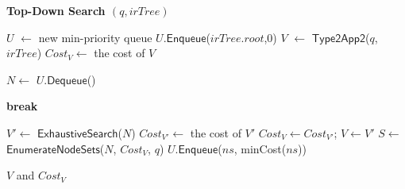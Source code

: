 \documentclass{sig-alternate}
\begin{document}
\begin{algorithm}[!t]  \label{alg:pb2exact} \small
\caption{\label{alg:topk} \bf {Top-Down Search} $(q, irTree)$}



$U$ $\leftarrow$ new min-priority queue\;
%
$U$.$\mathsf{Enqueue}$($irTree.root$,0)\;
%
$V$ $\leftarrow$ $\mathsf{Type2App2}$($q$, $irTree$)\; $Cost_V
\leftarrow$ the cost of $V$\;


 {
    $N \leftarrow$ $U$.$\mathsf{Dequeue}$()\;

    {{\bf break}\;}

    {
        $V' \leftarrow$ $\mathsf{ExhaustiveSearch}$($N$)\;
        $Cost_{V'} \leftarrow$ the cost of $V'$\;
        {
            $Cost_V \leftarrow Cost_{V'}$; $V \leftarrow V'$\;
        }
    }
    \Else
    {
        $S \leftarrow$ $\mathsf{EnumerateNodeSets}$($N$, $Cost_V$, $q$)\;
        {
            {$U$.$\mathsf{Enqueue}$($ns$, minCost($ns$))\;}
        }
    }
} \Return $V$ and $Cost_V$\vspace{-1ex}
\end{algorithm}
\end{document}
